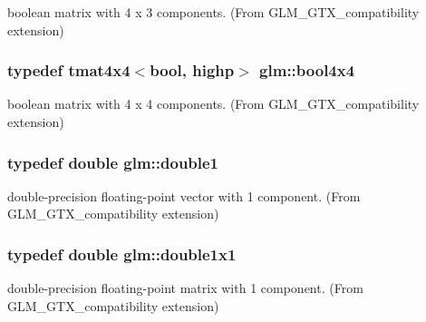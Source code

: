 boolean matrix with 4 x 3 components. (From G\+L\+M\+\_\+\+G\+T\+X\+\_\+compatibility extension) 

\hypertarget{group__gtx__compatibility_gafd4a5a69fab4d76f91ee75684f3bf2f1}{}
\subsubsection[{bool4x4}]{\setlength{\rightskip}{0pt plus 5cm}typedef tmat4x4$<$bool, highp$>$ {\bf glm\+::bool4x4}}\label{group__gtx__compatibility_gafd4a5a69fab4d76f91ee75684f3bf2f1}


boolean matrix with 4 x 4 components. (From G\+L\+M\+\_\+\+G\+T\+X\+\_\+compatibility extension) 

\hypertarget{group__gtx__compatibility_gab8b88350212cea916857cb2f49b8a29f}{}
\subsubsection[{double1}]{\setlength{\rightskip}{0pt plus 5cm}typedef double {\bf glm\+::double1}}\label{group__gtx__compatibility_gab8b88350212cea916857cb2f49b8a29f}


double-\/precision floating-\/point vector with 1 component. (From G\+L\+M\+\_\+\+G\+T\+X\+\_\+compatibility extension) 

\hypertarget{group__gtx__compatibility_ga1c87d3042377335eb050a20ab0ec148a}{}
\subsubsection[{double1x1}]{\setlength{\rightskip}{0pt plus 5cm}typedef double {\bf glm\+::double1x1}}\label{group__gtx__compatibility_ga1c87d3042377335eb050a20ab0ec148a}


double-\/precision floating-\/point matrix with 1 component. (From G\+L\+M\+\_\+\+G\+T\+X\+\_\+compatibility extension) 

